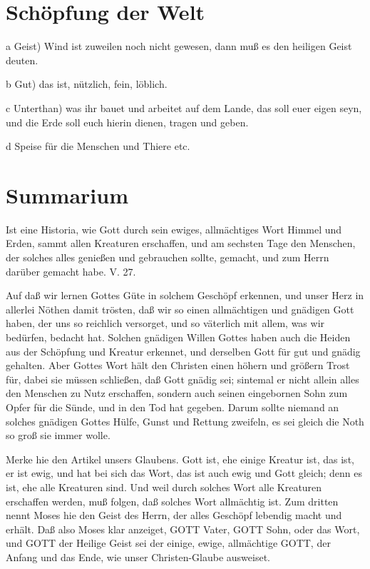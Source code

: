 \section{Schöpfung der Welt}

a Geist) Wind ist zuweilen noch nicht gewesen, dann muß es den heiligen Geist deuten.

b Gut) das ist, nützlich, fein, löblich.

c Unterthan) was ihr bauet und arbeitet auf dem Lande, das soll euer eigen seyn, und die Erde soll euch hierin dienen, tragen und geben.

d Speise für die Menschen und Thiere etc.

\section{Summarium}

Ist eine Historia, wie Gott durch sein ewiges, allmächtiges Wort Himmel und Erden, sammt allen Kreaturen erschaffen, und am sechsten Tage den Menschen, der solches alles genießen und gebrauchen sollte, gemacht, und zum Herrn darüber gemacht habe. V. 27.

Auf daß wir lernen Gottes Güte in solchem Geschöpf erkennen, und unser Herz in allerlei Nöthen damit trösten, daß wir so einen allmächtigen und gnädigen Gott haben, der uns so reichlich versorget, und so väterlich mit allem, was wir bedürfen, bedacht hat. Solchen gnädigen Willen Gottes haben auch die Heiden aus der Schöpfung und Kreatur erkennet, und derselben Gott für gut und gnädig gehalten. Aber Gottes Wort hält den Christen einen höhern und größern Trost für, dabei sie müssen schließen, daß Gott gnädig sei; sintemal er nicht allein alles den Menschen zu Nutz erschaffen, sondern auch seinen eingebornen Sohn zum Opfer für die Sünde, und in den Tod hat gegeben. Darum sollte niemand an solches gnädigen Gottes Hülfe, Gunst und Rettung zweifeln, es sei gleich die Noth so groß sie immer wolle.

Merke hie den Artikel unsers Glaubens. Gott ist, ehe einige Kreatur ist, das ist, er ist ewig, und hat bei sich das Wort, das ist auch ewig und Gott gleich; denn es ist, ehe alle Kreaturen sind. Und weil durch solches Wort alle Kreaturen erschaffen werden, muß folgen, daß solches Wort allmächtig ist. Zum dritten nennt Moses hie den Geist des Herrn, der alles Geschöpf lebendig macht und erhält. Daß also Moses klar anzeiget, GOTT Vater, GOTT Sohn, oder das Wort, und GOTT der Heilige Geist sei der einige, ewige, allmächtige GOTT, der Anfang und das Ende, wie unser Christen-Glaube ausweiset.

